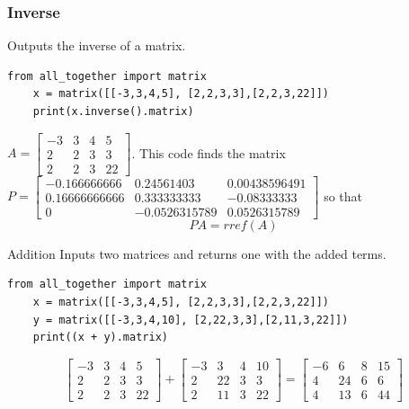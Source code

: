 \documentclass{beamer}
\begin{document}
\begin{frame}[fragile = singleslide]\frametitle{Inverse}
Outputs the inverse of a matrix.
\begin{verbatim}
from all_together import matrix
    x = matrix([[-3,3,4,5], [2,2,3,3],[2,2,3,22]])
    print(x.inverse().matrix) 
\end{verbatim}
\(A = \left[ \begin{array}{cccc} -3&3&4&5 \\ 2&2&3&3 \\ 2&2&3&22 \end{array}\right]\). This code finds the matrix \\ \(P = \left[ \begin{array}{cccc} -0.166666666&0.24561403&0.00438596491 \\ 0.16666666666&0.333333333&-0.08333333 \\ 0&-0.0526315789&0.0526315789 \end{array}\right]\) so that 
\begin{equation*}
     PA = rref(A) 
\end{equation*}
\end{frame}

\begin{frame}[fragile = singleslide]{Addition}
Inputs two matrices and returns one with the added terms.
\begin{verbatim}
from all_together import matrix
    x = matrix([[-3,3,4,5], [2,2,3,3],[2,2,3,22]])
    y = matrix([[-3,3,4,10], [2,22,3,3],[2,11,3,22]])
    print((x + y).matrix) 
\end{verbatim}
\begin{equation*}
    \left[
    \begin{array}{cccc}
    -3 & 3 & 4 &5   \\
     2&2&3&3 \\
     2&2&3&22
    \end{array}
    \right]
    +
    \left[
    \begin{array}{cccc}
    -3 & 3 & 4 &10   \\
     2&22&3&3 \\
     2&11&3&22
    \end{array}
    \right]
    =
    \left[
    \begin{array}{cccc}
        -6 & 6&8&15 \\
        4 &24&6&6\\
        4&13&6&44
    \end{array}
    \right]
\end{equation*}
\end{frame}
\end{document}
